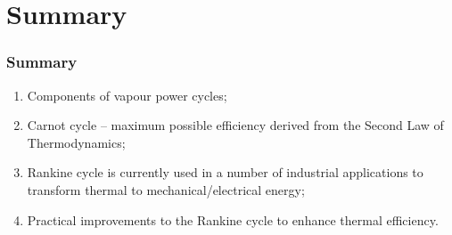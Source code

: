 \documentclass[10pt,compress]{beamer}
\begin{document}
\section{Summary}
\begin{frame}
 \frametitle{Summary}
  \begin{enumerate}
   \item Components of vapour power cycles;
   \item Carnot cycle -- maximum possible efficiency derived from the Second Law of Thermodynamics;
   \item Rankine cycle is currently used in a number of industrial applications to transform thermal to mechanical/electrical energy;
   \item Practical improvements to the Rankine cycle to enhance thermal efficiency.
  \end{enumerate}
\end{frame}
\end{document}
